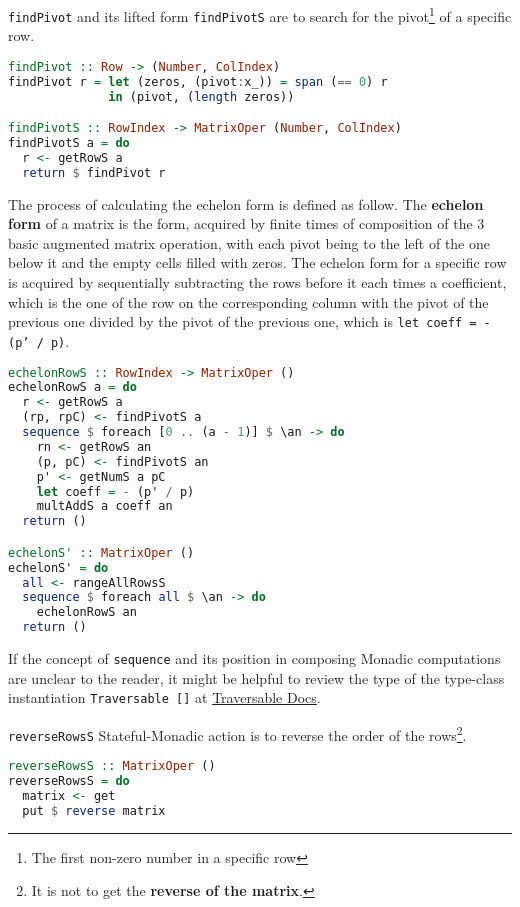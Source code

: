 \documentclass[12pt,a4paper]{article}
\begin{document}
\texttt{findPivot} and its lifted form \texttt{findPivotS} are to search for the pivot\footnote{The first non-zero number in a specific row} of a specific row.
\begin{lstlisting}[language=Haskell]
findPivot :: Row -> (Number, ColIndex)
findPivot r = let (zeros, (pivot:x_)) = span (== 0) r
              in (pivot, (length zeros))

findPivotS :: RowIndex -> MatrixOper (Number, ColIndex)
findPivotS a = do
  r <- getRowS a
  return $ findPivot r
\end{lstlisting}

The process of calculating the echelon form is defined as follow. The \textbf{echelon form} of a matrix is the form, acquired by finite times of composition of the 3 basic augmented matrix operation, with each pivot being to the left of the one below it and the empty cells filled with zeros. The echelon form for a specific row is acquired by sequentially subtracting the rows before it each times a coefficient, which is the one of the row on the corresponding column with the pivot of the previous one divided by the pivot of the previous one, which is \texttt{let coeff = - (p' / p)}.
\begin{lstlisting}[language=Haskell]
echelonRowS :: RowIndex -> MatrixOper ()
echelonRowS a = do
  r <- getRowS a
  (rp, rpC) <- findPivotS a
  sequence $ foreach [0 .. (a - 1)] $ \an -> do
    rn <- getRowS an
    (p, pC) <- findPivotS an
    p' <- getNumS a pC
    let coeff = - (p' / p)
    multAddS a coeff an
  return ()

echelonS' :: MatrixOper ()
echelonS' = do
  all <- rangeAllRowsS
  sequence $ foreach all $ \an -> do
    echelonRowS an
  return ()
\end{lstlisting}

If the concept of \texttt{sequence} and its position in composing Monadic computations are unclear to the reader, it might be helpful to review the type of the type-class instantiation \texttt{Traversable []} at \href{https://www.stackage.org/haddock/lts-9.14/base-4.9.1.0/Prelude.html#t:Traversable}{Traversable Docs}.

\texttt{reverseRowsS} Stateful-Monadic action is to reverse the order of the rows\footnote{It is not to get the \textbf{reverse of the matrix}.}.
\begin{lstlisting}[language=Haskell]
reverseRowsS :: MatrixOper ()
reverseRowsS = do
  matrix <- get
  put $ reverse matrix
\end{lstlisting}
\end{document}

